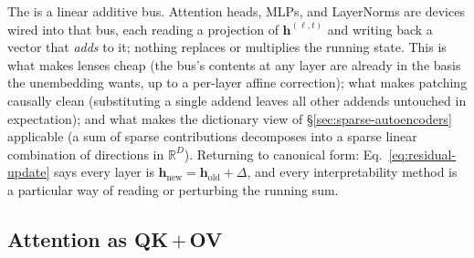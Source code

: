 \begin{intuition}
The  is a linear additive bus. Attention heads, MLPs,
and LayerNorms are devices wired into that bus, each reading a
projection of $\mathbf{h}^{(\ell, t)}$ and writing back a vector that
\emph{adds} to it; nothing replaces or multiplies the running state.
This is what makes lenses cheap (the bus's contents at any layer are
already in the basis the unembedding wants, up to a per-layer affine
correction); what makes patching causally clean (substituting a single
addend leaves all other addends untouched in expectation); and what
makes the dictionary view of \S\ref{sec:sparse-autoencoders}
applicable (a sum of sparse contributions decomposes into a sparse
linear combination of  directions in $\mathbb{R}^D$). Returning
to canonical form: Eq.~\eqref{eq:residual-update} says every layer is
$\mathbf{h}_{\text{new}} = \mathbf{h}_{\text{old}} + \Delta$, and every
interpretability method is a particular way of reading or perturbing
the running sum.
\end{intuition}

\subsection{Attention as QK\,$+$\,OV}
\label{sec:substrate-attention}

